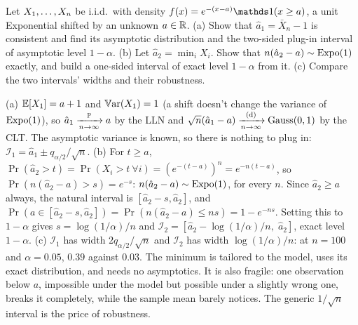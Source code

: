 \begin{exercise}
\label{ex:ci-shifted-expo}
Let $X_1, \ldots, X_n$ be i.i.d.\ with density $f(x) = e^{-(x - a)} \ind(x \geq a)$, a unit Exponential shifted by an unknown $a \in \mathbb{R}$. (a) Show that $\hat{a}_1 = \bar{X}_n - 1$ is consistent and find its asymptotic distribution and the two-sided plug-in interval of asymptotic level $1 - \alpha$. (b) Let $\hat{a}_2 = \min_i X_i$. Show that $n(\hat{a}_2 - a) \sim \text{Expo}(1)$ exactly, and build a one-sided interval of exact level $1 - \alpha$ from it. (c) Compare the two intervals' widths and their robustness.
\end{exercise}
\begin{solution}
(a) $\operatorname*{\mathbb{E}}[X_1] = a + 1$ and $\operatorname*{\mathbb{V}\text{ar}}(X_1) = 1$ (a shift doesn't change the variance of $\text{Expo}(1)$), so $\hat{a}_1 \xrightarrow [n \to \infty ]{\mathbb{P}} a$ by the LLN and $\sqrt{n}(\hat{a}_1 - a) \xrightarrow [n \to \infty ]{\text{(d)}} \text{Gauss}(0,1)$ by the CLT. The asymptotic variance is known, so there is nothing to plug in: $\mathcal{I}_1 = \hat{a}_1 \pm q_{\alpha/2}/\sqrt{n}$. (b) For $t \geq a$, $\Pr(\hat{a}_2 > t) = \Pr(X_i > t \ \forall i) = (e^{-(t-a)})^n = e^{-n(t-a)}$, so $\Pr(n(\hat{a}_2 - a) > s) = e^{-s}$: $n(\hat{a}_2 - a) \sim \text{Expo}(1)$, for every $n$. Since $\hat{a}_2 \geq a$ always, the natural interval is $[\hat{a}_2 - s, \hat{a}_2]$, and $\Pr(a \in [\hat{a}_2 - s, \hat{a}_2]) = \Pr(n(\hat{a}_2 - a) \leq ns) = 1 - e^{-ns}$. Setting this to $1 - \alpha$ gives $s = \log(1/\alpha)/n$ and $\mathcal{I}_2 = [\hat{a}_2 - \log(1/\alpha)/n, \; \hat{a}_2]$, exact level $1 - \alpha$. (c) $\mathcal{I}_1$ has width $2q_{\alpha/2}/\sqrt{n}$ and $\mathcal{I}_2$ has width $\log(1/\alpha)/n$: at $n = 100$ and $\alpha = 0.05$, $0.39$ against $0.03$. The minimum is tailored to the model, uses its exact distribution, and needs no asymptotics. It is also fragile: one observation below $a$, impossible under the model but possible under a slightly wrong one, breaks it completely, while the sample mean barely notices. The generic $1/\sqrt{n}$ interval is the price of robustness.
\end{solution}

